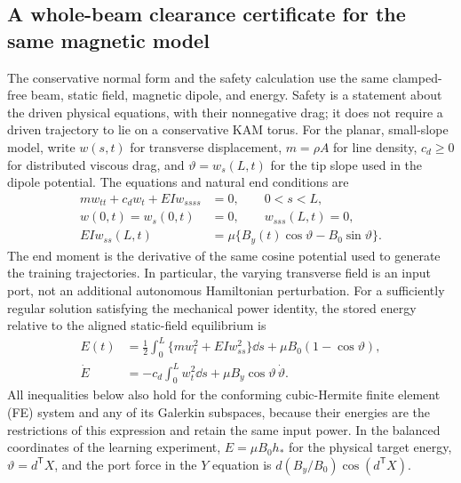\subsection{A whole-beam clearance certificate for the same magnetic model}
\label{sec:unifiedsafety}
The conservative normal form and the safety calculation use the same
clamped-free beam, static field, magnetic dipole, and energy.  Safety is a
statement about the driven physical equations, with their nonnegative drag;
it does not require a driven trajectory to lie on a conservative KAM torus.
For the planar, small-slope model, write $w(s,t)$ for transverse
displacement, $m=\rho A$ for line density, $c_d\geq0$ for distributed viscous
drag, and $\vartheta=w_s(L,t)$ for the tip slope used in the dipole potential.
The equations and natural end conditions are
\begin{align}
 m w_{tt}+c_d w_t+EIw_{ssss}&=0,\qquad 0<s<L,\\
 w(0,t)=w_s(0,t)&=0,\qquad w_{sss}(L,t)=0,\\
 EI w_{ss}(L,t)&=\mu\{B_y(t)\cos\vartheta-B_0\sin\vartheta\}.
 \label{eq:unifiedbeamportBC}
\end{align}
The end moment is the derivative of the same cosine potential used to
generate the training trajectories.  In particular, the varying transverse
field is an input port, not an additional autonomous Hamiltonian perturbation.
For a sufficiently regular solution satisfying the mechanical power identity,
the stored energy relative to the aligned static-field equilibrium is
\begin{align}
 E(t)&=\frac12\int_0^L\{m w_t^2+EIw_{ss}^2\}\dd s
        +\mu B_0(1-\cos\vartheta),\\
 \dot E&=-c_d\int_0^L w_t^2\dd s
             +\mu B_y\cos\vartheta\,\dot\vartheta.
 \label{eq:unifiedSIpower}
\end{align}
All inequalities below also hold for the conforming cubic-Hermite finite
element (FE) system and any of its Galerkin subspaces, because their energies
are the restrictions of this expression and retain the same input power.
In the balanced coordinates of the learning experiment, $E=\mu B_0 h_*$
for the physical target energy,
$\vartheta=d^{\mathsf T}X$, and the port force in the $Y$ equation is
$d(B_y/B_0)\cos(d^{\mathsf T}X)$.

